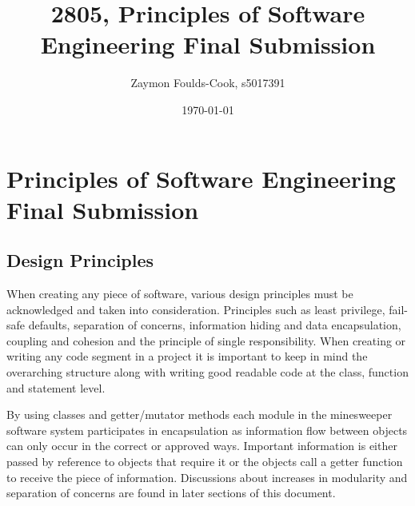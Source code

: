 \documentclass[12pt, a4]{report}
\title{2805, Principles of Software Engineering Final Submission}
\author{Zaymon Foulds-Cook, s5017391}%
\date{\today}
\begin{document}
\begin{titlepage}
	\maketitle
\end{titlepage}

\tableofcontents
\pagebreak


%
%
\section{Principles of Software Engineering Final Submission}
\subsection{Design Principles}
When creating any piece of software, various design principles must be acknowledged and taken into consideration. Principles such as least privilege, fail-safe defaults, separation of concerns, information hiding and data encapsulation, coupling and cohesion and the principle of single responsibility. When creating or writing any code segment in a project it is important to keep in mind the overarching structure along with writing good readable code at the class, function and statement level.
\newline\par
By using classes and getter/mutator methods each module in the minesweeper software system participates in encapsulation as information flow between objects can only occur in the correct or approved ways. Important information is either passed by reference to objects that require it or the objects call a getter function to receive the piece of information. Discussions about increases in modularity and separation of concerns are found in later sections of this document.

%
%
\end{document}
